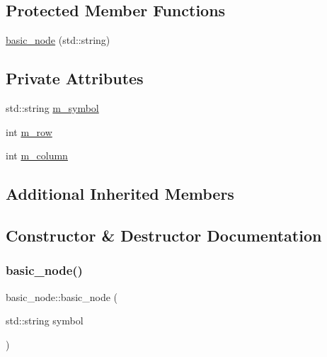 \subsection*{Protected Member Functions}
\begin{DoxyCompactItemize}
\item 
\hyperlink{classjawe_1_1basic__node_a2779d04e09d128b926171d1d543508d9}{basic\+\_\+node} (std\+::string)
\end{DoxyCompactItemize}
\subsection*{Private Attributes}
\begin{DoxyCompactItemize}
\item 
std\+::string \hyperlink{classjawe_1_1basic__node_ac6baed9e8bc01d8b953c1c42b8710057}{m\+\_\+symbol}
\item 
int \hyperlink{classjawe_1_1basic__node_ace1b7e8628dc9ac0b2562c6e2425d237}{m\+\_\+row}
\item 
int \hyperlink{classjawe_1_1basic__node_a219419e1836ea0af56c68aa8e026b0c6}{m\+\_\+column}
\end{DoxyCompactItemize}
\subsection*{Additional Inherited Members}


\subsection{Constructor \& Destructor Documentation}
\mbox{\label{classjawe_1_1basic__node_a2779d04e09d128b926171d1d543508d9}} 
\subsubsection{\texorpdfstring{basic\+\_\+node()}{basic\_node()}}
{\footnotesize\ttfamily basic\+\_\+node\+::basic\+\_\+node (\begin{DoxyParamCaption}\item[{std\+::string}]{symbol }\end{DoxyParamCaption})\hspace{0.3cm}{\ttfamily [protected]}}



